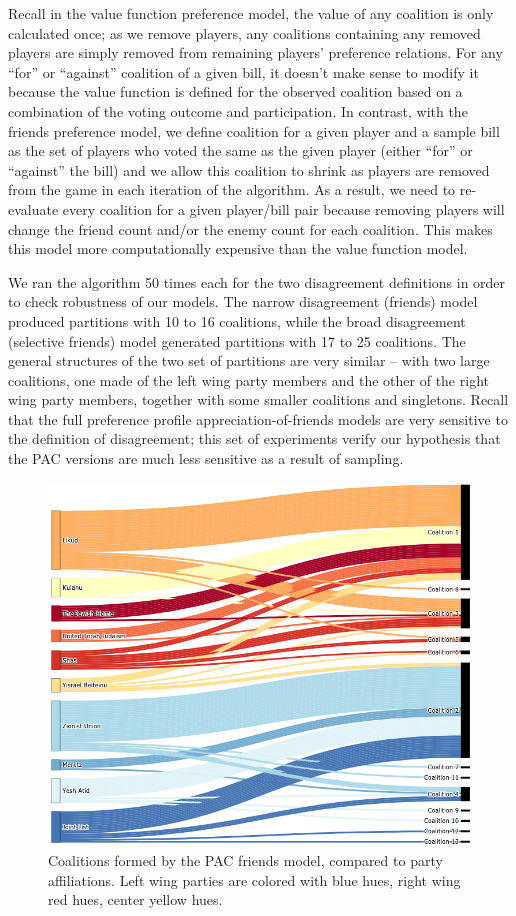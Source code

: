 \documentclass[letterpaper]{article} %
\theoremstyle{definition}
\begin{document}
Recall in the value function preference model, the value of any coalition is only calculated once; as we remove players, any coalitions containing any removed players are simply removed from remaining players' preference relations. For any ``for'' or ``against'' coalition of a given bill, it doesn't make sense to modify it because the value function is defined for the observed coalition based on a combination of the voting outcome and participation. In contrast, with the friends preference model, we define coalition for a given player and a sample bill as the set of players who voted the same as the given player (either ``for'' or ``against'' the bill) and we allow this coalition to shrink as players are removed from the game in each iteration of the algorithm. As a result, we need to re-evaluate every coalition for a given player/bill pair because removing players will change the friend count and/or the enemy count for each coalition. This makes this model more computationally expensive than the value function model.

We ran the algorithm 50 times each for the two disagreement definitions in order to check robustness of our models. The narrow disagreement (friends) model produced partitions with 10 to 16 coalitions, while the broad disagreement (selective friends) model generated partitions with 17 to 25 coalitions. The general structures of the two set of partitions are very similar – with two large coalitions, one made of the left wing party members and the other of the right wing party members, together with some smaller coalitions and singletons. Recall that the full preference profile appreciation-of-friends models are very sensitive to the definition of disagreement; this set of experiments verify our hypothesis that the PAC versions are much less sensitive as a result of sampling.

\begin{figure}[htb]
\includegraphics[width=\columnwidth]{pac_friends}
\caption{Coalitions formed by the PAC friends model, compared to party affiliations. Left wing parties are colored with blue hues, right wing red hues, center yellow hues.}
\end{figure}
\end{document}

